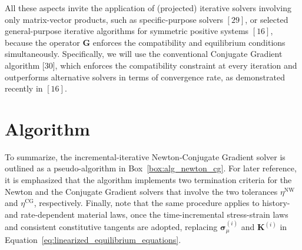 All these aspects invite the application of (projected) iterative solvers involving only matrix-vector products, such as specific-purpose solvers \cite{}\([29]\), or selected general-purpose iterative algorithms for symmetric positive systems \cite{}\([16]\), because the operator \(\bm G\) enforces the compatibility and equilibrium conditions simultaneously.
Specifically, we will use the conventional Conjugate Gradient algorithm \cite{}[30], which enforces the compatibility constraint at every iteration and outperforms alternative solvers in terms of convergence rate, as demonstrated recently in \cite{}\([16]\).

\section{Algorithm}

To summarize, the incremental-iterative Newton-Conjugate Gradient solver is outlined as a pseudo-algorithm in Box~\ref{box:alg_newton_cg}.
For later reference, it is emphasized that the algorithm implements two termination criteria for the Newton and the Conjugate Gradient solvers that involve the two tolerances \(\eta^{\mathrm{NW}}\) and \(\eta^{\mathrm{CG}}\), respectively.
Finally, note that the same procedure applies to history- and rate-dependent material laws, once the time-incremental stress-strain laws and consistent constitutive tangents are adopted, replacing \(\bm\sigma_\mu^{(i)}\) and \(\bm K^{(i)}\) in Equation~\eqref{eq:linearized_equilibrium_equations}.

